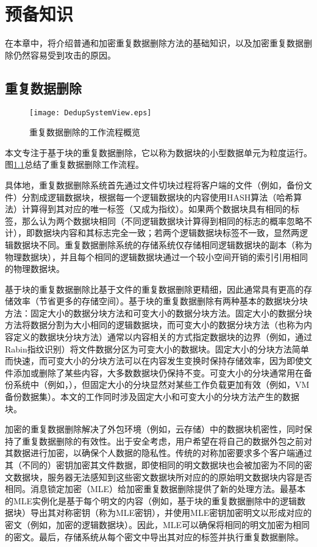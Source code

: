 \chapter{预备知识}

\label{sec:background}
在本章中，将介绍普通和加密重复数据删除方法的基础知识，以及加密重复数据删除仍然容易受到攻击的原因。

\section{重复数据删除}

\begin{figure}[!htb]
    \small
    \centering
    \texttt{[image: DedupSystemView.eps]}
    \caption{重复数据删除的工作流程概览} 
    \label{fig:重复数据删除的工作流程概览}
\end{figure}

本文专注于基于块的重复数据删除，它以称为数据块的小型数据单元为粒度运行。图\ref{fig:重复数据删除的工作流程概览}总结了重复数据删除工作流程。 

具体地，重复数据删除系统首先通过文件切块过程将客户端的文件（例如，备份文件）分割成逻辑数据块，根据每一个逻辑数据块的内容使用HASH算法（哈希算法）计算得到其对应的唯一标签（又成为指纹）。如果两个数据块具有相同的标签，那么认为两个数据块相同（不同逻辑数据块计算得到相同的标志的概率忽略不计），即数据块内容和其标志完全一致；若两个逻辑数据块标签不一致，显然两逻辑数据块不同。重复数据删除系统的存储系统仅存储相同逻辑数据块的副本（称为物理数据块），并且每个相同的逻辑数据块通过一个较小空间开销的索引引用相同的物理数据块。  

基于块的重复数据删除比基于文件的重复数据删除更精细，因此通常具有更高的存储效率（节省更多的存储空间）。基于块的重复数据删除有两种基本的数据块分块方法：固定大小的数据分块方法和可变大小的数据分块方法。固定大小的数据分块方法将数据分割为大小相同的逻辑数据块，而可变大小的数据分块方法（也称为内容定义的数据块分块方法）通常以内容相关的方式指定数据块的边界（例如，通过Rabin指纹识别）将文件数据分区为可变大小的数据块。固定大小的分块方法简单而快速，而可变大小的分块方法可以在内容发生变换时保持存储效率，因为即使文件添加或删除了某些内容，大多数数据块仍保持不变。可变大小的分块通常用在备份系统中（例如，），但固定大小的分块显然对某些工作负载更加有效（例如，VM备份数据集）。本文的工作同时涉及固定大小和可变大小的分块方法产生的数据块。

加密的重复数据删除解决了外包环境（例如，云存储）中的数据块机密性，同时保持了重复数据删除的有效性。出于安全考虑，用户希望在将自己的数据外包之前对其数据进行加密，以确保个人数据的隐私性。传统的对称加密要求多个客户端通过其（不同的）密钥加密其文件数据，即使相同的明文数据块也会被加密为不同的密文数据块，服务器无法感知到这些密文数据块所对应的的原始明文数据块内容是否相同。消息锁定加密（MLE）给加密重复数据删除提供了新的处理方法。最基本的MLE实例化是基于每个明文的内容（例如，基于块的重复数据删除中的逻辑数据块）导出其对称密钥（称为MLE密钥），并使用MLE密钥加密明文以形成对应的密文（例如，加密的逻辑数据块）。因此，MLE可以确保将相同的明文加密为相同的密文。最后，存储系统从每个密文中导出其对应的标签并执行重复数据删除。

